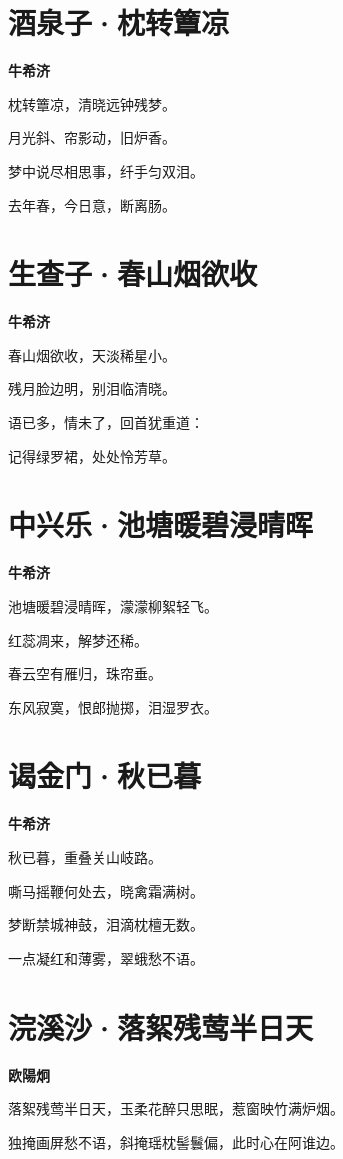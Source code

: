 \documentclass[12pt,a4paper]{ctexbook}
\begin{document}
\section{酒泉子·枕转簟凉}
\textbf{牛希济}\par\vspace{0.5em}
枕转簟凉，清晓远钟残梦。\par
月光斜、帘影动，旧炉香。\par
梦中说尽相思事，纤手匀双泪。\par
去年春，今日意，断离肠。\par

\section{生查子·春山烟欲收}
\textbf{牛希济}\par\vspace{0.5em}
春山烟欲收，天淡稀星小。\par
残月脸边明，别泪临清晓。\par
语已多，情未了，回首犹重道：\par
记得绿罗裙，处处怜芳草。\par

\section{中兴乐·池塘暖碧浸晴晖}
\textbf{牛希济}\par\vspace{0.5em}
池塘暖碧浸晴晖，濛濛柳絮轻飞。\par
红蕊凋来，解梦还稀。\par
春云空有雁归，珠帘垂。\par
东风寂寞，恨郎抛掷，泪湿罗衣。\par

\section{谒金门·秋已暮}
\textbf{牛希济}\par\vspace{0.5em}
秋已暮，重叠关山岐路。\par
嘶马摇鞭何处去，晓禽霜满树。\par
梦断禁城神鼓，泪滴枕檀无数。\par
一点凝红和薄雾，翠蛾愁不语。\par

\section{浣溪沙·落絮残莺半日天}
\textbf{欧陽炯}\par\vspace{0.5em}
落絮残莺半日天，玉柔花醉只思眠，惹窗映竹满炉烟。\par
独掩画屏愁不语，斜掩瑶枕髻鬟偏，此时心在阿谁边。\par
\end{document}
